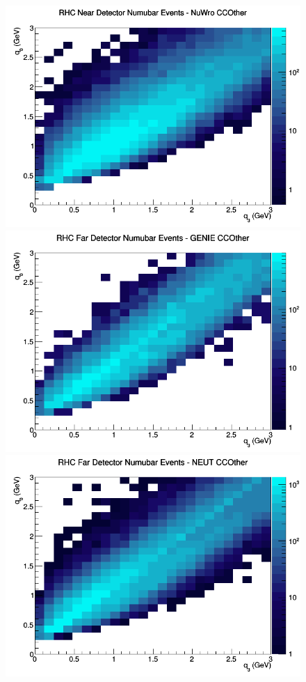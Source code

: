 \documentclass[12pt]{article}
\begin{document}
\begin{figure}[h]
\includegraphics[width=\linewidth]{eff_q0_q3/FGT/CCOther_RHC_ND_numubar_q3_q0_NuWro.png}
\endminipage
\newline
{}
\includegraphics[width=\linewidth]{eff_q0_q3/FGT/CCOther_RHC_FD_numubar_q3_q0_GENIE.png}
\endminipage
{}
\includegraphics[width=\linewidth]{eff_q0_q3/FGT/CCOther_RHC_FD_numubar_q3_q0_NEUT.png}

\end{figure}
\end{document}
